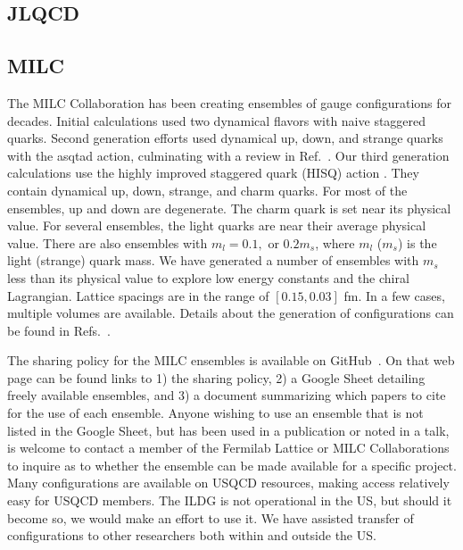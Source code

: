 \documentclass[a4paper,11pt]{article}
\begin{document}
\subsection{JLQCD}

\subsection{MILC}
The MILC Collaboration has been creating ensembles of gauge
configurations for decades.  Initial calculations used two dynamical
flavors with naive staggered quarks.  Second generation efforts used
dynamical up, down, and strange quarks with the asqtad action,
culminating with a review in Ref.~\cite{MILC:2009mpl}.  Our third
generation calculations use the highly improved staggered quark (HISQ)
action \cite{Follana:2006rc}.  They contain dynamical up, down,
strange, and charm quarks.  For most of the ensembles, up and down are
degenerate.  The charm quark is set near its physical value.  For
several ensembles, the light quarks are near their average physical
value.  There are also ensembles with $m_l= 0.1,$ or $0.2 m_s$, where
$m_l$ ($m_s$) is the light (strange) quark mass.  We have generated a
number of ensembles with $m_s$ less than its physical value to explore
low energy constants and the chiral Lagrangian.  Lattice spacings are
in the range of $[0.15, 0.03]$ fm.  In a few cases, multiple volumes
are available.  Details about the generation of configurations can be
found in Refs.~\cite{MILC:2010pul,MILC:2012znn,Bazavov:2017lyh}.

The sharing policy for the MILC ensembles is available on
GitHub~\cite{MILC:policy}. On that web page can be found links to 1)
the sharing policy, 2) a Google Sheet detailing freely available
ensembles, and 3) a document summarizing which papers to cite for the
use of each ensemble.  Anyone wishing to use an ensemble that is not
listed in the Google Sheet, but has been used in a publication or
noted in a talk, is welcome to contact a member of the Fermilab
Lattice or MILC Collaborations to inquire as to whether the ensemble
can be made available for a specific project.  Many configurations are
available on USQCD resources, making access relatively easy for USQCD
members.  The ILDG is not operational in the US, but should it become
so, we would make an effort to use it.  We have assisted transfer of
configurations to other researchers both within and outside the US.
\end{document}
